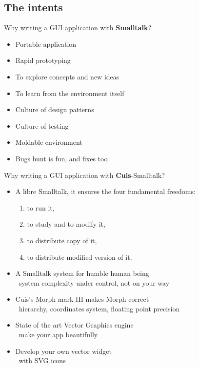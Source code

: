 \documentclass{beamer}
\newcommand{\tip}{\boldmath{\textcolor{red}{$\Rightarrow$}}}
\begin{document}
\subsection{The intents}
\begin{frame}{Why writing a GUI application with \textbf{Smalltalk}?}

  \begin{itemize}
  \item Portable application
  \item Rapid prototyping
  \item To explore concepts and new ideas
  \item To learn from the environment itself
  \item Culture of design patterns
  \item Culture of testing
  \item Moldable environment
  \item Bugs hunt is fun, and fixes too
  \end{itemize}
\end{frame}
%
\begin{frame}{Why writing a GUI application with \textbf{Cuis}-Smalltalk?}

  \begin{itemize}
  \item A libre Smalltalk, it ensures \alert{the four fundamental freedoms}:
    \begin{enumerate}
    \item to run it,
    \item to study and to modify it,
    \item to distribute copy of it,
    \item to distribute modified version of it.
    \end{enumerate}
     
  \item A Smalltalk system for humble human being\\
    \tip\ system complexity under control, not on your way
  \item Cuis's \alert{Morph mark III} makes Morph correct \\
    \tip\ hierarchy, coordinates system, floating point precision
  \item State of the art \alert{Vector Graphics} engine \\
    \tip\ make your app beautifully 
  \item Develop your own vector widget \\
    \tip\ with \textsc{SVG} icons
  \end{itemize}
\end{frame}
\end{document}
